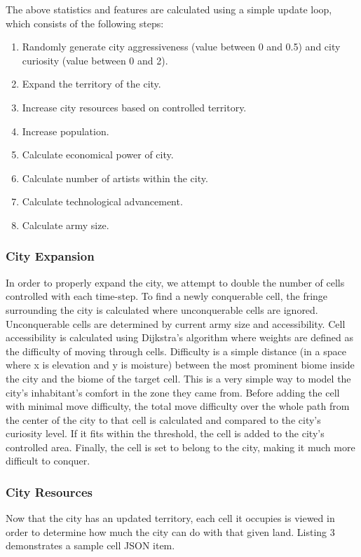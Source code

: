 The above statistics and features are calculated using a simple update loop, which consists of the following steps:

\begin{enumerate}
\item Randomly generate city aggressiveness (value between 0 and 0.5) and city curiosity (value between 0 and 2).
\item Expand the territory of the city.
\item Increase city resources based on controlled territory.
\item Increase population.
\item Calculate economical power of city.
\item Calculate number of artists within the city.
\item Calculate technological advancement.
\item Calculate army size.
\end{enumerate}

\subsubsection{City Expansion}
In order to properly expand the city, we attempt to double the number of cells controlled with each time-step. To find a newly conquerable cell, the fringe surrounding the city is calculated where unconquerable cells are ignored. Unconquerable cells are determined by current army size and accessibility. Cell accessibility is calculated using Dijkstra's algorithm where weights are defined as the difficulty of moving through cells. Difficulty is a simple distance (in a space where x is elevation and y is moisture) between the most prominent biome inside the city and the biome of the target cell. This is a very simple way to model the city's inhabitant's comfort in the zone they came from. Before adding the cell with minimal move difficulty, the total move difficulty over the whole path from the center of the city to that cell is calculated and compared to the city's curiosity level. If it fits within the threshold, the cell is added to the city's controlled area. Finally, the cell is set to belong to the city, making it much more difficult to conquer.

\subsubsection{City Resources}
Now that the city has an updated territory, each cell it occupies is viewed in order to determine how much the city can do with that given land. Listing 3 demonstrates a sample cell JSON item.


